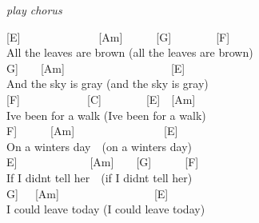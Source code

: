 \documentclass[
  letterpaper,
  a5paper]{memoir}
\begin{document}
\emph{play chorus}

{[}E{]}~~~~~~~~~~~~~~{[}Am{]}~~~~~~{[}G{]}~~~~~~~~{[}F{]}\\
All the leaves are brown (all the leaves are brown)\\
\hspace*{0.333em}\hspace*{0.333em}\hspace*{0.333em}\hspace*{0.333em}\hspace*{0.333em}\hspace*{0.333em}\hspace*{0.333em}{[}G{]}~~~~{[}Am{]}~~~~~~~~~~~~~~~~~~~{[}E{]}\\
And the sky is gray (and the sky is gray)\\
{[}F{]}~~~~~~~~~~~~{[}C{]}~~~~~~~~{[}E{]}~~{[}Am{]}\\
I\textquotesingle ve been for a walk (I\textquotesingle ve been for a
walk)\\
\hspace*{0.333em}\hspace*{0.333em}\hspace*{0.333em}\hspace*{0.333em}{[}F{]}~~~~~~{[}Am{]}~~~~~~~~~~~~~~~~{[}E{]}\\
On a winter\textquotesingle s day~~(on a winter\textquotesingle s day)\\
\hspace*{0.333em}\hspace*{0.333em}\hspace*{0.333em}\hspace*{0.333em}\hspace*{0.333em}\hspace*{0.333em}\hspace*{0.333em}{[}E{]}~~~~~~~~~~~~~{[}Am{]}~~~~{[}G{]}~~~~~~{[}F{]}\\
If I didn\textquotesingle t tell her~~(if I didn\textquotesingle t tell
her)\\
\hspace*{0.333em}\hspace*{0.333em}\hspace*{0.333em}\hspace*{0.333em}\hspace*{0.333em}\hspace*{0.333em}\hspace*{0.333em}{[}G{]}~~~{[}Am{]}~~~~~~~~~~~~~~~~~{[}E{]}\\
I could leave today (I could leave today)
\end{document}
